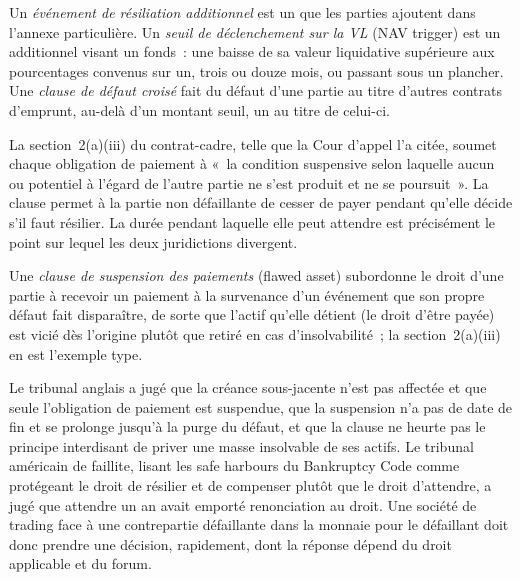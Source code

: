 \begin{definition}\label{def:fm:legal-documentation:ate}
Un \emph{événement de résiliation additionnel} est un  que les parties ajoutent dans l'annexe particulière. Un \emph{seuil de
déclenchement sur la VL} (NAV trigger) est un  additionnel visant un fonds~: une baisse de sa valeur liquidative supérieure aux pourcentages convenus sur
un, trois ou douze mois, ou passant sous un plancher. Une \emph{clause de défaut croisé} fait du défaut d'une partie au titre d'autres
contrats d'emprunt, au-delà d'un montant seuil, un  au titre de celui-ci.
\end{definition}

La section~2(a)(iii) du contrat-cadre, telle que la Cour d'appel l'a citée, soumet chaque obligation de paiement à «~la condition suspensive selon laquelle
aucun  ou  potentiel à l'égard de l'autre partie ne s'est produit et ne se poursuit~». La clause permet à la
partie non défaillante de cesser de payer pendant qu'elle décide s'il faut résilier. La durée pendant laquelle elle peut attendre est précisément le point sur lequel les deux juridictions divergent.

\begin{definition}\label{def:fm:legal-documentation:flawed}
Une \emph{clause de suspension des paiements} (flawed asset) subordonne le droit d'une partie à recevoir un paiement à la survenance d'un événement que son propre défaut
fait disparaître, de sorte que l'actif qu'elle détient (le droit d'être payée) est vicié dès l'origine plutôt que retiré en cas d'insolvabilité~; la section~2(a)(iii) en
est l'exemple type.
\end{definition}

Le tribunal anglais a jugé que la créance sous-jacente n'est pas affectée et que seule l'obligation de paiement est suspendue, que la suspension n'a pas de date de fin et
se prolonge jusqu'à la purge du défaut, et que la clause ne heurte pas le principe interdisant de priver une masse insolvable de ses actifs. Le
tribunal américain de faillite, lisant les safe harbours du Bankruptcy Code comme protégeant le droit de résilier et de compenser plutôt que le droit d'attendre, a jugé que
attendre un an avait emporté renonciation au droit. Une société de trading face à une contrepartie défaillante dans la monnaie pour le défaillant doit donc prendre une décision, rapidement,
dont la réponse dépend du droit applicable et du forum.

